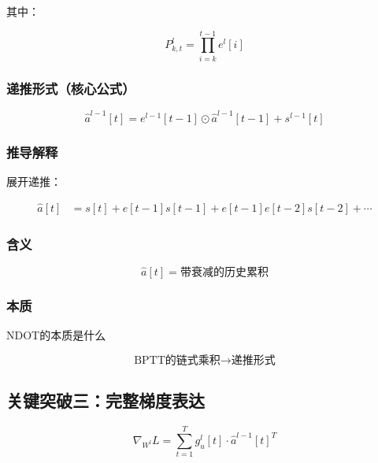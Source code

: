 \documentclass[journal,12pt,onecolumn]{IEEEtran}
\begin{document}
其中：

\begin{equation}
P^{l}_{k,t}
=
\prod_{i=k}^{t-1} e^l[i]
\end{equation}



\subsubsection{递推形式（核心公式）}

\begin{equation}
\hat{a}^{l-1}[t]
=
e^{l-1}[t-1] \odot \hat{a}^{l-1}[t-1]
+
s^{l-1}[t]
\end{equation}



\subsubsection{推导解释}

展开递推：

\begin{align}
\hat{a}[t]
&= s[t] + e[t-1] s[t-1] + e[t-1]e[t-2] s[t-2] + \cdots
\end{align}



\subsubsection{含义}

\begin{equation}
\hat{a}[t] = \text{带衰减的历史累积}
\end{equation}



\subsubsection{本质}

NDOT的本质是什么 

\begin{equation}
\text{BPTT的链式乘积} \rightarrow \text{递推形式}
\end{equation}



\subsection{关键突破三：完整梯度表达}

\begin{equation}
\nabla_{W^l} L
=
\sum_{t=1}^{T}
g_u^l[t] \cdot \hat{a}^{l-1}[t]^T
\end{equation}
\end{document}
